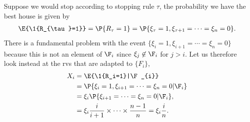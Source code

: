 \documentclass[a4paper]{article}
\begin{document}
Suppose we would stop according to stopping rule \(\tau\), the probability we have the best house is given by
\begin{align*}
\E{\1{R_{\tau}=1}} = \P{R_{\tau} = 1} = \P{\xi_{\tau} = 1, \xi_{\tau+1} = \cdots = \xi_n = 0}.
\end{align*}
There is a fundamental problem with the event \(\{\xi_{i} = 1, \xi_{i+1} = \cdots = \xi_n = 0\}\) because this is not an element of \(\F_{i}\) since \(\xi_{j} \not \in \F_{i}\) for \(j> i\). Let us therefore look instead at the rvs that are adapted to \(\{F_i\}\),
\begin{align*}
X_i &= \E{\1{R_i=1}|\F_{i}} \\
&= \P{\xi_{i} = 1, \xi_{i+1} = \cdots = \xi_n = 0|\F_i} \\
&=\xi_{i} \P{\xi_{i+1} = \cdots = \xi_n = 0|\F_i}, \\
&=\xi_{i} \frac{i}{i+1} \times \cdots \times \frac{n-1}{n} = \xi_i \frac{i}{n}.
\end{align*}
\end{document}
